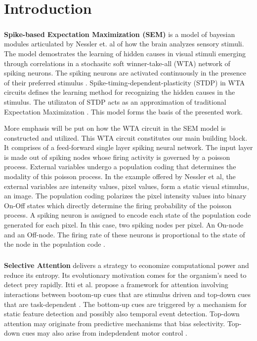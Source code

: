 \documentclass{report}
\begin{document}
\chapter{Introduction}

\paragraph{}\textbf{Spike-based Expectation Maximization (SEM)} is a model of bayesian modules articulated by Nessler et. al of how the brain analyzes sensory stimuli. The model demostrates the learning of hidden causes in visual stimuli emerging through correlations in a stochasitc soft winner-take-all (WTA) network of spiking neurons. The spiking neurons are activated continuously in the presence of their preferred stimulus \cite{Nessler2010}. Spike-timing-dependent-plasticity (STDP) in WTA circuits defines the learning method for recognizing the hidden causes in the stimulus. The utilizaton of STDP acts as an approximation of traditional Expectation Maximization \cite{Nessler2013}. This model forms the basis of the presented work.

More emphasis will be put on how the WTA circuit in the SEM model is constructed and utilized. This WTA circuit constitutes our main building block. It comprises of a feed-forward single layer spiking neural network. The input layer is made out of spiking nodes whose firing activity is governed  by a poisson process. External variables undergo a population coding that determines the modality of this poisson process. In the example offered by Nessler et al, the external variables are intensity values, pixel values, form a static visual stimulus, an image. The population coding polarizes the pixel intensity values into binary On-Off states which directly determine the firing probability of the poisson process. A spiking neuron is assigned to encode each state of the population code generated for each pixel. In this case, two spiking nodes per pixel. An On-node and an Off-node. The firing rate of these neurons is proportional to the state of the node in the population code \cite{Nessler2010}.

\paragraph{}\textbf{Selective Attention} delivers a strategy to economize computational power and reduce its entropy. Its evolutionary motivation comes for the organism's need to detect prey rapidly. Itti et al. propose a framework for attention involving interactions between bootom-up cues that are stimulus driven and top-down cues that are task-dependent \cite{Itti2001}. The bottom-up cues are triggered by a mechanism for static feature detection and possibly also temporal event detection. Top-down attention may originate from predictive mechanisms that bias selectivity. Top-down cues may also arise from indepdendent motor control \cite{Olshausen1993}.
\end{document}
